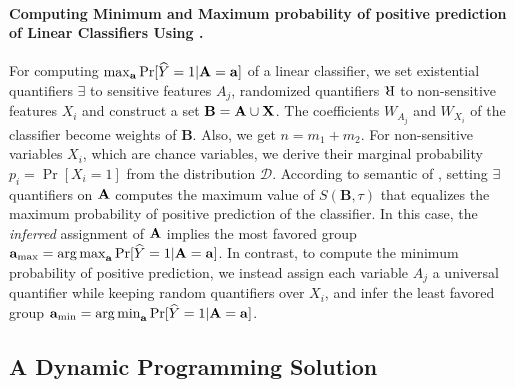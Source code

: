 \paragraph{Computing Minimum and Maximum probability of positive prediction of Linear Classifiers Using  {\stochastic}.} For computing $ \max_{ \mathbf{a}} \Pr[\widehat{Y} =1 | \mathbf{A} = \mathbf{a}] $ of a linear classifier, we set existential quantifiers $ \exists $ to sensitive features $ A_j $, randomized quantifiers $ \R $ to non-sensitive features $ X_i $ and construct a set $ \mathbf{B} = \mathbf{A} \cup \mathbf{X} $.  The coefficients $ W_{A_j} $ and $ W_{X_i} $ of the classifier become weights of $ \mathbf{B} $. Also, we get $n=m_1 +m_2$. For non-sensitive variables $ X_i $, which are chance variables, we derive their marginal probability $ p_i = \Pr[X_i = 1] $ from the distribution $ \mathcal{D} $.  According to semantic of {\stochastic}, setting $ \exists $ quantifiers on $ \mathbf{A} $ computes the maximum value of $ S(\mathbf{B}, \tau) $ that equalizes the maximum probability of positive prediction of the classifier. In this case, the \textit{inferred} assignment of $ \mathbf{A} $ implies the most favored group $ \mathbf{a}_{{\max}} =  \operatorname*{arg\,max}_{ \mathbf{a}} \Pr[\widehat{Y} =1 | \mathbf{A} = \mathbf{a}] $. In contrast, to compute the minimum probability of positive prediction, we instead assign each variable  $ A_j $ a universal  quantifier  while keeping random quantifiers over $ X_i $, and infer the least favored group $ \mathbf{a}_{{\min}} =  \operatorname*{arg\,min}_{ \mathbf{a}} \Pr[\widehat{Y} =1 | \mathbf{A} = \mathbf{a}] $.

\iffalse
\red{The decision version of computing the maximum (minimum) \red{\red{probability of positive prediction}} is to decide whether there is an assignment of \textit{sensitive} or \textit{choice variables}, for which the \textit{non-sensitive} or \textit{chance variables} yield a \red{\red{probability of positive prediction}} greater or less than $\alpha \in [0,1]$. Now, we formally state the hardness of verifying linear classifiers followed by an efficient dynamic programming solution.
\begin{lemma}
	\label{fvgm_lm:hardness}
	The decision version of the fairness verification problem for linear classifiers is in $\mathrm{NP^{PP}}$.
\end{lemma}}
\fi

 
 
 \subsection{A Dynamic Programming Solution}
 \label{fvgm_sec:dp_formulation}


